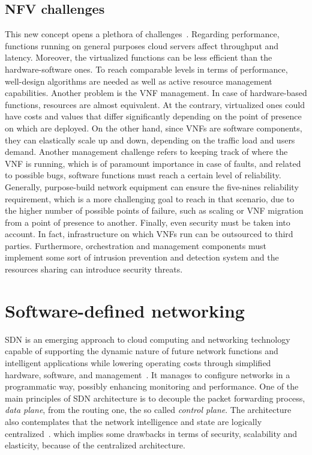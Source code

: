 \subsection{NFV challenges}
This new concept opens a plethora of challenges~\cite{han2015network}. Regarding
performance, functions running on general purposes cloud servers affect
throughput and latency. Moreover, the virtualized functions can be less
efficient than the hardware-software ones. To reach comparable levels in
terms of performance, well-design algorithms are needed as well as active
resource management capabilities. Another problem is the VNF management. In case
of hardware-based functions, resources are almost equivalent. At the contrary,
virtualized ones could have costs and values that differ significantly
depending on the point of presence on which are deployed. On the other hand,
since VNFs are software components, they can elastically scale up and down,
depending on the traffic load and users demand. Another management challenge
refers to keeping track of where the VNF is running, which is of paramount
importance in case of faults, and related to possible bugs, software functions
must reach a certain level of reliability. Generally, purpose-build network
equipment can ensure the five-nines reliability requirement, which is a more
challenging goal to reach in that scenario, due to the higher number of possible
points of failure, such as scaling or VNF migration from a point
of presence to another. Finally, even security must be taken into account. In
fact, infrastructure on which VNFs run can be outsourced to third parties.
Furthermore, orchestration and management components must implement some sort of
intrusion prevention and detection system and the resources sharing can
introduce security threats.

\section{Software-defined networking}
SDN is an emerging approach to cloud computing and networking technology
capable of supporting the dynamic nature of future network functions and
intelligent applications while lowering operating costs through simplified
hardware, software, and management~\cite{sezer2013we}. It manages to configure
networks in a programmatic way, possibly enhancing monitoring and
performance. One of the main principles of SDN architecture is to decouple the
packet forwarding process, \emph{data plane}, from the routing one, the so
called \emph{control plane}. The architecture also contemplates that the network
intelligence and state are logically centralized~\cite{fundation2012software}. 
which implies some drawbacks in terms of security, scalability and elasticity,
because of the centralized architecture.

